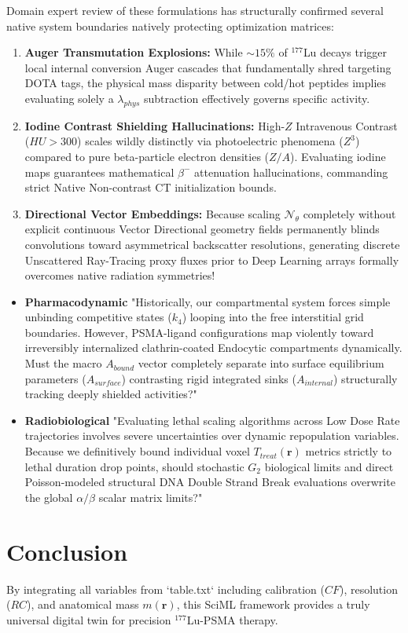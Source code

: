 \documentclass[11pt,a4paper]{article}
\begin{document}
Domain expert review of these formulations has structurally confirmed several native system boundaries natively protecting optimization matrices:
\begin{enumerate}
    \item \textbf{Auger Transmutation Explosions:} While $\sim 15\%$ of $^{177}$Lu decays trigger local internal conversion Auger cascades that fundamentally shred targeting DOTA tags, the physical mass disparity between cold/hot peptides implies evaluating solely a $\lambda_{phys}$ subtraction effectively governs specific activity.
    \item \textbf{Iodine Contrast Shielding Hallucinations:} High-$Z$ Intravenous Contrast ($HU > 300$) scales wildly distinctly via photoelectric phenomena ($Z^3$) compared to pure beta-particle electron densities ($Z/A$). Evaluating iodine maps guarantees mathematical $\beta^-$ attenuation hallucinations, commanding strict Native Non-contrast CT initialization bounds.
    \item \textbf{Directional Vector Embeddings:} Because scaling $\mathcal{N}_\theta$ completely without explicit continuous Vector Directional geometry fields permanently blinds convolutions toward asymmetrical backscatter resolutions, generating discrete Unscattered Ray-Tracing proxy fluxes prior to Deep Learning arrays formally overcomes native radiation symmetries!
\end{enumerate}


\begin{itemize}
    \item \textbf{ Pharmacodynamic } "Historically, our compartmental system forces simple unbinding competitive states ($k_4$) looping into the free interstitial grid boundaries. However, PSMA-ligand configurations map violently toward irreversibly internalized clathrin-coated Endocytic compartments dynamically. Must the macro $A_{bound}$ vector completely separate into surface equilibrium parameters ($A_{surface}$) contrasting rigid integrated sinks ($A_{internal}$) structurally tracking deeply shielded activities?"
    \item \textbf{Radiobiological} "Evaluating lethal scaling algorithms across Low Dose Rate trajectories involves severe uncertainties over dynamic repopulation variables. Because we definitively bound individual voxel $T_{treat}(\mathbf{r})$ metrics strictly to lethal duration drop points, should stochastic $G_2$ biological limits and direct Poisson-modeled structural DNA Double Strand Break evaluations overwrite the global $\alpha / \beta$ scalar matrix limits?"
\end{itemize}

\section{Conclusion}
By integrating all variables from `table.txt` including calibration ($CF$), resolution ($RC$), and anatomical mass $m(\mathbf{r})$, this SciML framework provides a truly universal digital twin for precision $^{177}$Lu-PSMA therapy.



\end{document}
